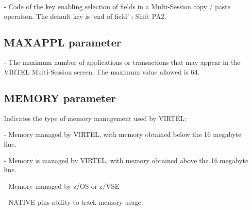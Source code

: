 \documentclass[letterpaper,10pt,english]{sphinxmanual}
\begin{document}
 - Code of the key enabling selection of fields in a Multi-Session copy / paste operation. The default key is ‘end of field’ : Shift PA2.


\subsection{MAXAPPL parameter}
\label{\detokenize{Installation_Guide:index-88}}\label{\detokenize{Installation_Guide:maxappl-parameter}}
\begin{sphinxVerbatim}[commandchars=\\\{\}]
                            
\end{sphinxVerbatim}

 - The maximum number of applications or transactions that may appear in the VIRTEL Multi-Session screen. The maximum value allowed is 64.


\subsection{MEMORY parameter}
\label{\detokenize{Installation_Guide:index-89}}\label{\detokenize{Installation_Guide:memory-parameter}}
\begin{sphinxVerbatim}[commandchars=\\\{\}]
\PYG{p}{[}\PYG{p}{]} 
\end{sphinxVerbatim}

Indicates the type of memory management used by VIRTEL:

 - Memory managed by VIRTEL, with memory obtained below the 16 megabyte line.

 - Memory is managed by VIRTEL, with memory obtained above the 16 megabyte line.

 - Memory managed by z/OS or z/VSE

 - NATIVE plus ability to track memory usage.
\end{document}
